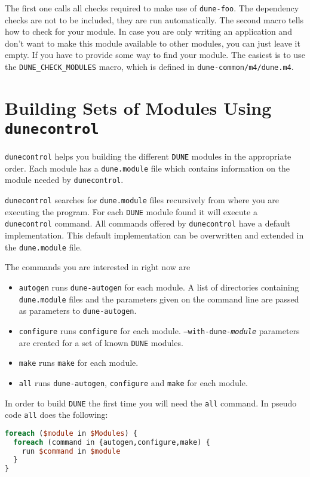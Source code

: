 \documentclass[11pt,a4paper,headinclude,footinclude,DIV16,normalheadings]{scrartcl}
\newcommand{\dune}{\texttt{DUNE}\xspace}
\newcommand{\autogen}{\texttt{dune-autogen}\xspace}
\newcommand{\configure}{\texttt{configure}\xspace}
\newcommand{\dunecontrol}{\texttt{dunecontrol}\xspace}
\newcommand{\dunemodule}{\texttt{dune.module}\xspace}
\newcommand{\make}{\texttt{make}\xspace}
\begin{document}
The first one calls all checks required to make use of
\texttt{dune-foo}. The dependency checks are not to be included, they
are run automatically. The second macro tells how to check for your
module. In case you are only writing an application and don't want to
make this module available to other modules, you can just leave it
empty. If you have to provide some way to find your module. The
easiest is to use the \texttt{DUNE\_CHECK\_MODULES} macro, which is
defined in \texttt{dune-common/m4/dune.m4}.

\section{Building Sets of Modules Using \dunecontrol}
\label{dunecontrol}
\dunecontrol helps you building the different \dune modules in the
appropriate order. Each module has a \dunemodule file which contains
information on the module needed by \dunecontrol. 

\dunecontrol searches for \dunemodule files recursively from where you
are executing the program. For each \dune module found it will execute
a \dunecontrol command. All commands offered by \dunecontrol have a
default implementation. This default implementation can be overwritten
and extended in the \dunemodule file.

The commands you are interested in right now are
\begin{itemize}
\item \texttt{autogen} runs \autogen for each module. A list of
  directories containing \dunemodule files and the parameters given on
  the command line are passed as parameters to \autogen.
\item \texttt{configure} runs \configure for each
  module. \texttt{--with-dune-\textit{module}} parameters are created
  for a set of known \dune modules.
\item \texttt{make} runs \make for each module.
\item \texttt{all} runs \autogen, \configure and \make for each module.
\end{itemize}

In order to build \dune the first time you will need the \texttt{all}
command. In pseudo code \texttt{all} does the following:
\begin{lstlisting}[language=Perl]
foreach ($module in $Modules) {
  foreach (command in {autogen,configure,make) {
    run $command in $module
  }
}
\end{lstlisting}
\end{document}
